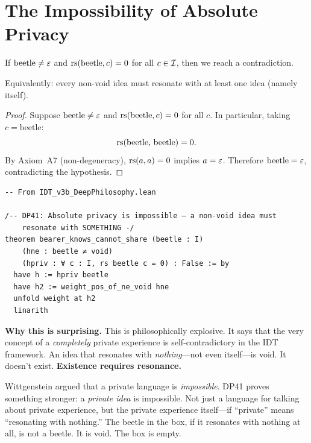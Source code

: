 \section{The Impossibility of Absolute Privacy}

\begin{theorem}
\label{thm:absolute-privacy-impossible}
If $\mathrm{beetle} \neq \varepsilon$ and $\mathrm{rs}(\mathrm{beetle}, c) = 0$ for all
$c \in \mathcal{I}$, then we reach a contradiction.

Equivalently: every non-void idea must resonate with at least one idea
(namely itself).
\end{theorem}

\begin{proof}
Suppose $\mathrm{beetle} \neq \varepsilon$ and $\mathrm{rs}(\mathrm{beetle}, c) = 0$ for
all $c$.  In particular, taking $c = \mathrm{beetle}$:
\[
\mathrm{rs}(\mathrm{beetle},\, \mathrm{beetle}) = 0.
\]
By Axiom~A7 (non-degeneracy), $\mathrm{rs}(a, a) = 0$ implies $a = \varepsilon$.  Therefore
$\mathrm{beetle} = \varepsilon$, contradicting the hypothesis.
\end{proof}

\begin{lstlisting}
-- From IDT_v3b_DeepPhilosophy.lean

/-- DP41: Absolute privacy is impossible — a non-void idea must
    resonate with SOMETHING -/
theorem bearer_knows_cannot_share (beetle : I)
    (hne : beetle ≠ void)
    (hpriv : ∀ c : I, rs beetle c = 0) : False := by
  have h := hpriv beetle
  have h2 := weight_pos_of_ne_void hne
  unfold weight at h2
  linarith
\end{lstlisting}

\begin{surprisebox}
\noindent\textbf{Why this is surprising.}
This is philosophically explosive.  It says that the very concept of a
\emph{completely} private experience is self-contradictory in the IDT
framework.  An idea that resonates with \emph{nothing}---not even
itself---is void.  It doesn't exist.  \textbf{Existence requires resonance.}

Wittgenstein argued that a private language is \emph{impossible}.  DP41 proves
something stronger: a \emph{private idea} is impossible.  Not just a language
for talking about private experience, but the private experience itself---if
``private'' means ``resonating with nothing.''  The beetle in the box, if it
resonates with nothing at all, is not a beetle.  It is void.  The box is
empty.
\end{surprisebox}

